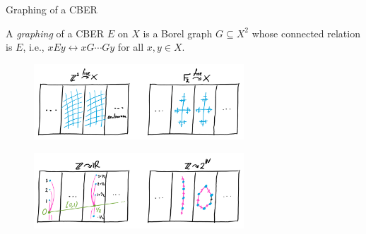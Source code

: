\documentclass{beamer}
\begin{document}
    \begin{frame}{Graphing of a CBER}
        \begin{definition}
            A \textit{graphing} of a CBER $E$ on $X$ is a Borel graph $G\subseteq X^2$ whose connected relation is $E$, i.e., $xEy\leftrightarrow xG\cdots Gy$ for all $x,y\in X$.
        \end{definition}

        \pause
        \vspace{-0.15in}

        \begin{figure}[h]
            \center
            \includegraphics[width=0.7\textwidth]{img/group_action.png}
        \end{figure}
        \vspace{-0.2in}
        \begin{figure}[h]
            \center
            \includegraphics[width=0.7\textwidth]{img/smooth_hyperfinite.png}
        \end{figure}
    \end{frame}
\end{document}
